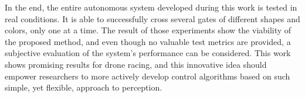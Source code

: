 In the end, the entire autonomous system developed during this work is tested
in real conditions. It is able to successfully cross several gates of
different shapes and colors, only one at a time. The result of those
experiments show the viability of the proposed method, and even though no
valuable test metrics are provided, a subjective evaluation of the system's
performance can be considered. This work shows promising results for drone
racing, and this innovative idea should empower researchers to more actively
develop control algorithms based on such simple, yet flexible, approach to
perception.
